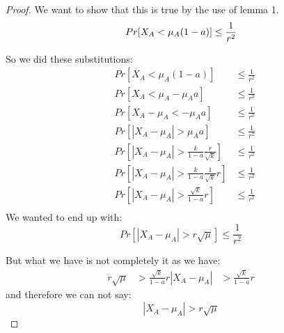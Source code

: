 
\begin{proof}
    We want to show that this is true by the use of lemma 1.
    \begin{equation*}
        Pr[X_A < \mu_A(1-a)] \le \frac{1}{r^2}\\
    \end{equation*}

    So we did these substitutions:
    \begin{align*}
        &Pr[X_A < \mu_A(1-a)] &\le \frac{1}{r^2}\\
        &Pr[X_A < \mu_A - \mu_A a] &\le \frac{1}{r^2}\\
        &Pr[X_A - \mu_A < - \mu_A a] &\le \frac{1}{r^2}\\
        &Pr[|X_A - \mu_A| > \mu_A a] &\le \frac{1}{r^2}\\
        &Pr[|X_A - \mu_A| > \frac{k}{1-a} \frac{r}{\sqrt{k}}]   &\le \frac{1}{r^2}\\
        &Pr[|X_A - \mu_A| > \frac{k}{1-a} \frac{1}{\sqrt{k}} r] &\le \frac{1}{r^2}\\
        &Pr[|X_A - \mu_A| > \frac{\sqrt{k}}{1-a} r]&\le \frac{1}{r^2}\\
    \end{align*}
    We wanted to end up with:
    \begin{equation*}
        Pr[|X_A - \mu_A| > r \sqrt{\mu}] \le \frac{1}{r^2}
    \end{equation*}

    But what we have is not completely it as we have:
    \begin{align*}
        r \sqrt{\mu} &> \frac{\sqrt{k}}{1-a} r
        |X_A - \mu_A| &> \frac{\sqrt{k}}{1-a} r
    \end{align*}
    and therefore we can not say:
    \begin{equation*}
        |X_A - \mu_A| > r \sqrt{\mu}
    \end{equation*}


\end{proof}
